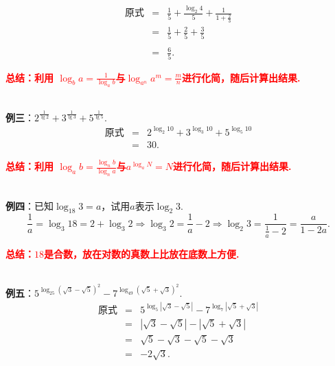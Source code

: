 \documentclass[8pt]{article}
\begin{document}
					$$
					\begin{array}{rcl}
					\text{原式}&=&\displaystyle \frac{1}{5}+\frac{\log_{2}{4}}{5}+\frac{1}{1+\frac{2}{3}}\\
					&=&\displaystyle \frac{1}{5}+\frac{2}{5}+\frac{3}{5}\\\\
					&=&\displaystyle \frac{6}{5}.
					\end{array}
					$$

					\textcolor{red}{\textbf{总结：利用 $\displaystyle \log_{b}{a}=\frac{1}{\log_{a}{b}}$与$\log_{a^n}{a^m}=\frac{m}{n}$进行化简，随后计算出结果.}}

				~\\

				\textbf{例三}：$\displaystyle 2^{\frac{1}{\lg 2}}+3^{\frac{1}{\lg 3}}+5^{\frac{1}{\lg 5}}$.
					~\\

					$$
					\begin{array}{rcl}
					\text{原式}&=&2^{\log_{2}{10}}+3^{\log_{3}{10}}+5^{\log_{5}{10}}\\
					&=&30.
					\end{array}
					$$

					\textcolor{red}{\textbf{总结：利用 $\displaystyle \log_{a}{b}=\frac{\log_{n}{b}}{\log_{n}{a}}$与$\displaystyle a^{\log_{a}{N}}=N$进行化简，随后计算出结果.}}

				~\\

				\textbf{例四}：已知$\log_{18} 3 = a$，试用$a$表示$\log_{2} 3$.
					~\\

					$$
					\frac{1}{a} = \log_{3} 18=2+\log_{3} 2 \Rightarrow \log_{3} 2=\frac{1}{a}-2 \Rightarrow \log_{2} 3=\frac{1}{\frac{1}{a}-2}=\frac{a}{1-2a}.
					$$

					\textcolor{red}{\textbf{总结：$18$是合数，放在对数的真数上比放在底数上方便.}}

				~\\

				\textbf{例五}：$\displaystyle 5^{\log_{25} (\sqrt{3}-\sqrt{5})^2} - 7^{\log_{49} (\sqrt{5}+\sqrt{3})^2}.$
					~\\

					$$
					\begin{array}{rcl}
						\text{原式}&=&\displaystyle 5^{\log_{5} |\sqrt{3}-\sqrt{5}|} - 7^{\log_{7} |\sqrt{5}+\sqrt{3}|}\\
						&=&|\sqrt{3}-\sqrt{5}|-|\sqrt{5}+\sqrt{3}|\\
						&=&\sqrt{5}-\sqrt{3}-\sqrt{5}-\sqrt{3}\\
						&=&-2\sqrt{3}.
					\end{array}
					$$
\end{document}
